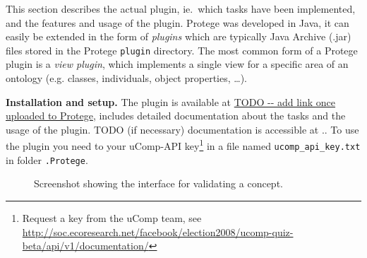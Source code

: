 This section describes the actual plugin, ie.~which tasks have been implemented, and the features and usage of the plugin.
Protege was developed in Java, it can easily be extended in the form of \emph{plugins} which are typically Java Archive (.jar) files
stored in the Protege \texttt{plugin} directory. The most common form of a Protege plugin is a \emph{view plugin}, which implements a single view for a specific area of an ontology (e.g. classes, individuals, object properties, \dots).

\textbf{Installation and setup.}
The plugin is available at \url{TODO -- add link once uploaded to Protege}, includes detailed documentation about the tasks and
the usage of the plugin. TODO (if necessary) documentation is accessible at ..
To use the plugin you need to your uComp-API key\footnote{Request a key from the uComp team, see \url{http://soc.ecoresearch.net/facebook/election2008/ucomp-quiz-beta/api/v1/documentation/}} in a file named \texttt{ucomp\_api\_key.txt} in folder \texttt{.Protege}.




\begin{figure}[htb]
\centering
{\centering {}}
 \caption{\label{fig:screen_cr}Screenshot showing the interface for validating a concept.}
\end{figure}

